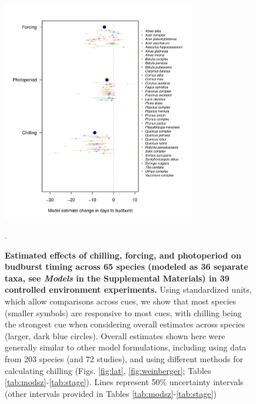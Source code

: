 \documentclass{article}
\begin{document}
\begin{figure}[h!]
\centering
\noindent \includegraphics[width=0.75\textwidth]{..//..//analyses/bb_analysis/figures/muplotspcompexprampfputah_z.pdf}
\caption{\textbf{Estimated effects of chilling, forcing, and photoperiod on budburst timing across 65 species (modeled as 36 separate taxa, see \emph{Models} in the Supplemental Materials) in 39 controlled environment experiments.} Using standardized units, which allow comparisons across cues, we show that most species (smaller symbols) are responsive to most cues, with chilling being the strongest cue when considering overall estimates across species (larger, dark blue circles). Overall estimates shown here were generally similar to other model formulations, including using data from 203 species (and 72 studies), and using different methods for calculating chilling (Figs. \ref{fig:lat}, \ref{fig:weinberger}; Tables \ref{tab:modsz}-\ref{tab:stage}). Lines represent 50\% uncertainty intervals (other intervals provided in Tables \ref{tab:modsz}-\ref{tab:stage})}. %
\label{fig:mu}
\end{figure}

\newpage
\end{document}

